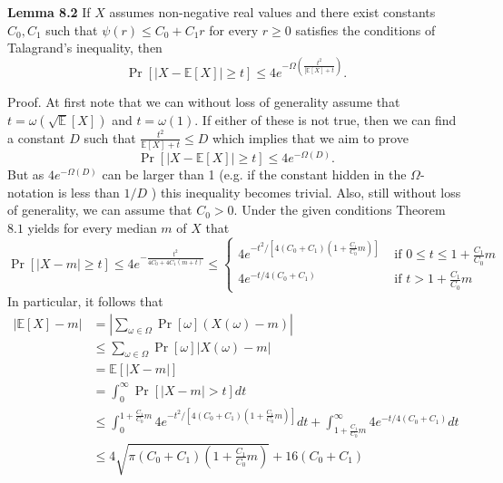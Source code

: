 \textbf{Lemma 8.2} If $X$ assumes non-negative real values and there exist constants $C_{0}, C_{1}$ such that $\psi(r) \leq C_{0}+C_{1} r$ for every $r \geq 0$ satisfies the conditions of Talagrand's inequality, then
$$
\operatorname{Pr}[|X-\mathbb{E}[X]| \geq t] \leq 4 e^{-\Omega\left(\frac{t^{2}}{[\mathbb{E}[X]+t}\right)} .
$$

Proof. At first note that we can without loss of generality assume that $t=\omega(\sqrt{\mathbb{E}}[X])$ and $t=\omega(1)$. If either of these is not true, then we can find a constant $D$ such that $\frac{t^{2}}{\mathbb{E}[X]+t} \leq D$ which implies that we aim to prove
$$
\operatorname{Pr}[|X-\mathbb{E}[X]| \geq t] \leq 4 e^{-\Omega(D)} .
$$
But as $4 e^{-\Omega(D)}$ can be larger than 1 (e.g. if the constant hidden in the $\Omega$-notation is less than $1 / D$ ) this inequality becomes trivial. Also, still without loss of generality, we can assume that $C_{0}>0$.
Under the given conditions Theorem $8.1$ yields for every median $m$ of $X$ that
$$
\operatorname{Pr}[|X-m| \geq t] \leq 4 e^{-\frac{t^{2}}{4 C_{0}+4 C_{1}(m+t)}} \leq \begin{cases}4 e^{-t^{2} /\left[4\left(C_{0}+C_{1}\right)\left(1+\frac{C_{1}}{C_{0}} m\right)\right]} & \text { if } 0 \leq t \leq 1+\frac{C_{1}}{C_{0}} m \\ 4 e^{-t / 4\left(C_{0}+C_{1}\right)} & \text { if } t>1+\frac{C_{1}}{C_{0}} m\end{cases}
$$
In particular, it follows that
$$
\begin{aligned}
|\mathbb{E}[X]-m| &=\left|\sum_{\omega \in \Omega} \operatorname{Pr}[\omega](X(\omega)-m)\right| \\
& \leq \sum_{\omega \in \Omega} \operatorname{Pr}[\omega]|X(\omega)-m| \\
&=\mathbb{E}[|X-m|] \\
&=\int_{0}^{\infty} \operatorname{Pr}[|X-m|>t] d t \\
& \leq \int_{0}^{1+\frac{C_{1}}{C_{0}} m} 4 e^{-t^{2} /\left[4\left(C_{0}+C_{1}\right)\left(1+\frac{C_{1}}{C_{0}} m\right)\right]} d t+\int_{1+\frac{C_{1}}{C_{0}} m}^{\infty} 4 e^{-t / 4\left(C_{0}+C_{1}\right)} d t \\
& \leq 4 \sqrt{\pi\left(C_{0}+C_{1}\right)\left(1+\frac{C_{1}}{C_{0}} m\right)}+16\left(C_{0}+C_{1}\right)
\end{aligned}
$$

